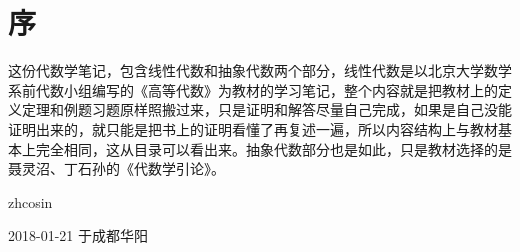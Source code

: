 
\chapter*{序}
\thispagestyle{empty}

这份代数学笔记，包含线性代数和抽象代数两个部分，线性代数是以北京大学数学系前代数小组编写的《高等代数》为教材的学习笔记，整个内容就是把教材上的定义定理和例题习题原样照搬过来，只是证明和解答尽量自己完成，如果是自己没能证明出来的，就只能是把书上的证明看懂了再复述一遍，所以内容结构上与教材基本上完全相同，这从目录可以看出来。抽象代数部分也是如此，只是教材选择的是聂灵沼、丁石孙的《代数学引论》。

\vspace{1.5cm}

\hfill zhcosin \hspace{5em}

\hfill 2018-01-21 于成都华阳 \hspace{1.5em}


